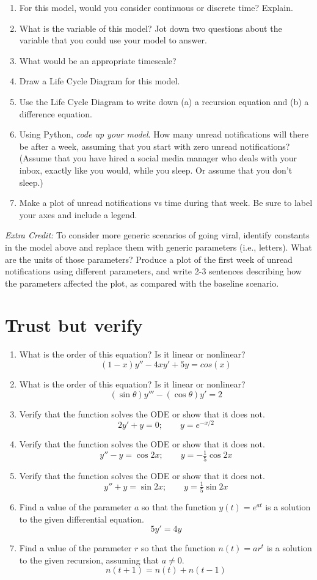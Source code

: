 \documentclass[11pt,onecolumn,superscriptaddress,notitlepage]{article}
\begin{document}
\begin{enumerate}[resume]
	\item For this model, would you consider continuous or discrete time? Explain. 
	\item What is the variable of this model? Jot down two questions about the variable that you could use your model to answer. 
	\item What would be an appropriate timescale? 
	\item Draw a Life Cycle Diagram for this model. 
	\item Use the Life Cycle Diagram to write down (a) a recursion equation and (b) a difference equation.
	\item Using Python, {\it code up your model}. How many unread notifications will there be after a week, assuming that you start with zero unread notifications? (Assume that you have hired a social media manager who deals with your inbox, exactly like you would, while you sleep. Or assume that you don't sleep.)
	\item Make a plot of unread notifications vs time during that week. Be sure to label your axes and include a legend. 
\end{enumerate}

{\it Extra Credit:} To consider more generic scenarios of going viral, identify constants in the model above and replace them with generic parameters (i.e., letters). What are the units of those parameters? Produce a plot of the first week of unread notifications using different parameters, and write 2-3 sentences describing how the parameters affected the plot, as compared with the baseline scenario. 

\clearpage
\section*{Trust but verify}

\begin{enumerate}[resume]
	\item What is the order of this equation? Is it linear or nonlinear? 
	$$(1-x)y'' - 4xy' + 5y = cos(x)$$
	\item What is the order of this equation? Is it linear or nonlinear? 
	$$(\sin \theta) y''' - (\cos \theta) y' = 2$$
	\item Verify that the function solves the ODE or show that it does not. 
	$$2y' + y = 0; \qquad y=e^{-x/2}$$
	\item Verify that the function solves the ODE or show that it does not.
	$$y'' - y = \cos{2x}; \qquad y=-\tfrac{1}{5}\cos{2x}$$
	\item Verify that the function solves the ODE or show that it does not.
	$$y'' + y = \sin{2x}; \qquad y=\tfrac{1}{5}\sin{2x}$$
	\item Find a value of the parameter $a$ so that the function $y(t)=e^{at}$ is a solution to the given differential equation.
	$$ 5y' = 4y$$
	\item Find a value of the parameter $r$ so that the function $n(t) = a r^t$ is a solution to the given recursion, assuming that $a\neq 0$.
	$$ n(t+1) = n(t) + n(t-1)$$
\end{enumerate}
\end{document}

